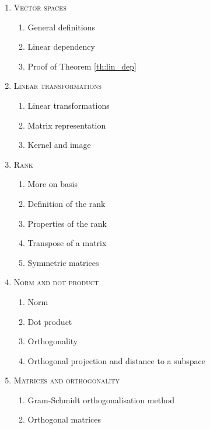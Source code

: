 \begin{enumerate}[label=\textbf{\arabic*.}]
\item \textsc{Vector spaces}
\begin{enumerate}[label=\arabic*.]
\item General definitions
\item Linear dependency
\item Proof of Theorem \ref{th:lin_dep}
\end{enumerate}
\item \textsc{Linear transformations}
\begin{enumerate}[label=\arabic*.]
\item Linear transformations
\item Matrix representation
\item Kernel and image
\end{enumerate}
\item \textsc{Rank}
\begin{enumerate}[label=\arabic*.]
\item More on basis
\item Definition of the rank
\item Properties of the rank
\item Transpose of a matrix
\item Symmetric matrices
\end{enumerate}
\item \textsc{Norm and dot product}
\begin{enumerate}[label=\arabic*.]
\item Norm
\item Dot product
\item Orthogonality
\item Orthogonal projection and distance to a subspace
\end{enumerate}
\item \textsc{Matrices and orthogonality}
\begin{enumerate}[label=\arabic*.]
\item Gram-Schmidt orthogonalisation method
\item Orthogonal matrices
\end{enumerate}
\end{enumerate}
